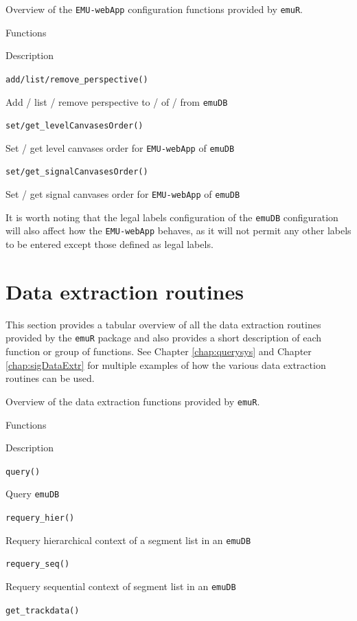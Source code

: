 \documentclass[]{book}
\begin{document}
\label{tab:emuRpackageDetails-emuWebAppConfig}Overview of the \texttt{EMU-webApp} configuration functions provided by \texttt{emuR}.

Functions

Description

\texttt{add/list/remove\_perspective()}

Add / list / remove perspective to / of / from \texttt{emuDB}

\texttt{set/get\_levelCanvasesOrder()}

Set / get level canvases order for \texttt{EMU-webApp} of \texttt{emuDB}

\texttt{set/get\_signalCanvasesOrder()}

Set / get signal canvases order for \texttt{EMU-webApp} of \texttt{emuDB}

It is worth noting that the legal labels configuration of the \texttt{emuDB} configuration will also affect how the \texttt{EMU-webApp} behaves, as it will not permit any other labels to be entered except those defined as legal labels.

\hypertarget{sec:emuRpackageDetails-dataExtr}{%
\section{Data extraction routines}\label{sec:emuRpackageDetails-dataExtr}}

This section provides a tabular overview of all the data extraction routines provided by the \texttt{emuR} package and also provides a short description of each function or group of functions. See Chapter \ref{chap:querysys} and Chapter \ref{chap:sigDataExtr} for multiple examples of how the various data extraction routines can be used.

\label{tab:emuRpackageDetails-dataExtr}Overview of the data extraction functions provided by \texttt{emuR}.

Functions

Description

\texttt{query()}

Query \texttt{emuDB}

\texttt{requery\_hier()}

Requery hierarchical context of a segment list in an \texttt{emuDB}

\texttt{requery\_seq()}

Requery sequential context of segment list in an \texttt{emuDB}

\texttt{get\_trackdata()}
\end{document}
